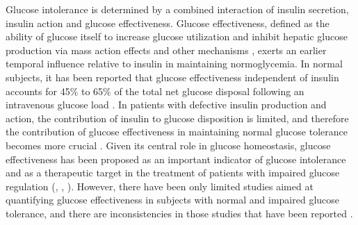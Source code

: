 \documentclass[utf8]{frontiersSCNS} %
\begin{document}
Glucose intolerance is determined by a combined interaction of insulin secretion, insulin action and glucose effectiveness. Glucose effectiveness, defined as the ability of glucose itself to increase glucose utilization and inhibit hepatic glucose production via mass action effects and other mechanisms \citep{Dube2015}, exerts an earlier temporal influence relative to insulin in maintaining normoglycemia. In normal subjects, it has been reported that glucose effectiveness independent of insulin accounts for 45\% to 65\% of the total net glucose disposal following an intravenous glucose load \citep{Alford_2018}. In patients with defective insulin production and action, the contribution of insulin to glucose disposition is limited, and therefore the contribution of glucose effectiveness in maintaining normal glucose tolerance becomes more crucial \citep{Dube2015}. Given its central role in glucose homeostasis, glucose effectiveness has been proposed as an important indicator of glucose intolerance and as a therapeutic target in the treatment of patients with impaired glucose regulation (\citet{basu_2009}, \citet{pau_2014}, \citet{Alford_2018}). However, there have been only limited studies aimed at quantifying glucose effectiveness in subjects with normal and impaired glucose tolerance, and there are inconsistencies in those studies that have been reported \citep{Dube2015}.
\end{document}
